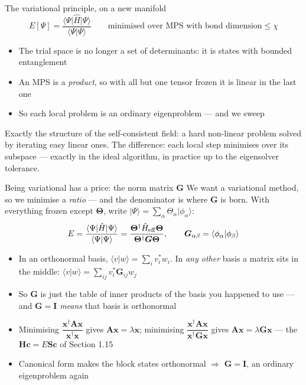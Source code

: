 \documentclass[aspectratio=169,10pt]{beamer}
\newcommand{\mbbox}[1]{%
  \begin{tcolorbox}[colback=paleblue,colframe=uioblue,title={\bfseries Many-body connection}]
  #1
  \end{tcolorbox}}
\newcommand{\ket}[1]{\vert #1\rangle}
\newcommand{\braket}[2]{\langle #1\vert #2\rangle}
\newcommand{\element}[3]{\langle #1\vert #2\vert #3\rangle}
\newcommand{\bmat}[1]{\bm{#1}}
\newcommand{\hH}{\hat{H}}
\begin{document}
\begin{frame}{The variational principle, on a new manifold}
  \[
    E[\Psi]=\frac{\element{\Psi}{\hH}{\Psi}}{\braket\Psi\Psi}
    \qquad\text{minimised over MPS with bond dimension}\le\chi
  \]
  \begin{itemize}
    \item The trial space is no longer a set of determinants: it is \alert{states with bounded entanglement}
    \item An MPS is a \emph{product}, so with all but one tensor frozen it is \alert{linear} in the last one
    \item So each local problem is an ordinary eigenproblem --- and we \alert{sweep}
  \end{itemize}
  \vspace{0.4em}
  \mbbox{Exactly the structure of the self-consistent field: a hard non-linear problem solved by iterating easy linear ones. The difference: each local step minimises over its subspace --- exactly in the ideal algorithm, in practice up to
  the eigensolver tolerance.}
\end{frame}

\begin{frame}{Being variational has a price: the norm matrix $\bmat G$}
  We want a \alert{variational} method, so we minimise a \emph{ratio} --- and the denominator is where $\bmat G$ is born.
  With everything frozen except $\bm\Theta$, write $\ket\Psi=\sum_\alpha\Theta_\alpha\ket{\phi_\alpha}$:
  \[
    E=\frac{\element\Psi\hH\Psi}{\braket\Psi\Psi}
     =\frac{\bm\Theta^\dagger\hH_{\rm eff}\bm\Theta}{\bm\Theta^\dagger\bmat G\bm\Theta},
    \qquad
    \bmat G_{\alpha\beta}=\braket{\phi_\alpha}{\phi_\beta}
  \]
  \begin{itemize}
    \item In an \alert{orthonormal} basis, $\braket vw=\sum_i v_i^*w_i$. In \emph{any other} basis a matrix sits in the middle: $\braket vw=\sum_{ij}v_i^*\bmat G_{ij}w_j$
    \item So $\bmat G$ is just the table of inner products of the basis you happened to use --- and $\bmat G=\bmat I$ \emph{means} that basis is orthonormal
    \item Minimising $\dfrac{\bm x^\dagger\bmat A\bm x}{\bm x^\dagger\bm x}$ gives $\bmat A\bm x=\lambda\bm x$; minimising $\dfrac{\bm x^\dagger\bmat A\bm x}{\bm x^\dagger\bmat G\bm x}$ gives $\bmat A\bm x=\lambda\bmat G\bm x$ --- the $\bmat H\bmat c=E\bmat S\bmat c$ of Section 1.15
    \item Canonical form makes the block states orthonormal $\Rightarrow$ $\bmat G=\bmat I$, an \alert{ordinary} eigenproblem again
  \end{itemize}
\end{frame}
\end{document}
